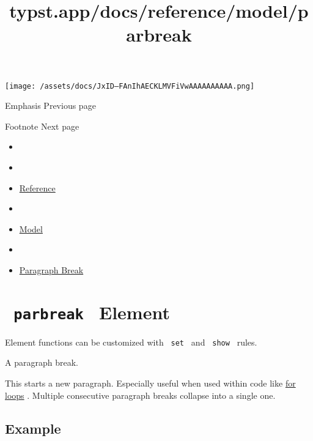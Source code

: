\texttt{[image: /assets/docs/JxID--FAnIhAECKLMVFiVwAAAAAAAAAA.png]}

\href{/docs/reference/model/emph/}{\pandocbounded{}}

{ Emphasis } { Previous page }

\href{/docs/reference/model/footnote/}{\pandocbounded{}}

{ Footnote } { Next page }


\title{typst.app/docs/reference/model/parbreak}

\begin{itemize}
\tightlist
\item
  \href{/docs}{}
\item
  
\item
  \href{/docs/reference/}{Reference}
\item
  
\item
  \href{/docs/reference/model/}{Model}
\item
  
\item
  \href{/docs/reference/model/parbreak/}{Paragraph Break}
\end{itemize}

\section{\texorpdfstring{\texttt{\ parbreak\ } {{ Element
}}}{ parbreak   Element }}\label{summary}

\label{element-tooltip}
Element functions can be customized with \texttt{\ set\ } and
\texttt{\ show\ } rules.

A paragraph break.

This starts a new paragraph. Especially useful when used within code
like \href{/docs/reference/scripting/\#loops}{for loops} . Multiple
consecutive paragraph breaks collapse into a single one.

\subsection{Example}\label{example}

